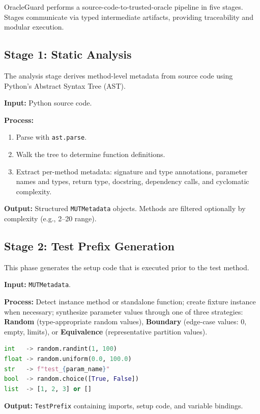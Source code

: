 \documentclass[conference]{IEEEtran}
\begin{document}
OracleGuard performs a source-code-to-trusted-oracle pipeline in five stages. Stages communicate via typed intermediate artifacts, providing traceability and modular execution.

\subsection{Stage 1: Static Analysis}

The analysis stage derives method-level metadata from source code using Python's Abstract Syntax Tree (AST).

\textbf{Input:} Python source code.

\textbf{Process:}
\begin{enumerate}
\item Parse with \texttt{ast.parse}.
\item Walk the tree to determine function definitions.
\item Extract per-method metadata: signature and type annotations, parameter names and types, return type, docstring, dependency calls, and cyclomatic complexity.
\end{enumerate}

\textbf{Output:} Structured \texttt{MUTMetadata} objects. Methods are filtered optionally by complexity (e.g., 2--20 range).

\subsection{Stage 2: Test Prefix Generation}

This phase generates the setup code that is executed prior to the test method.

\textbf{Input:} \texttt{MUTMetadata}.

\textbf{Process:} Detect instance method or standalone function; create fixture instance when necessary; synthesize parameter values through one of three strategies: \textbf{Random} (type-appropriate random values), \textbf{Boundary} (edge-case values: 0, empty, limits), or \textbf{Equivalence} (representative partition values).

\begin{lstlisting}[language=Python]
int   -> random.randint(1, 100)
float -> random.uniform(0.0, 100.0)
str   -> f"test_{param_name}"
bool  -> random.choice([True, False])
list  -> [1, 2, 3] or []
\end{lstlisting}

\textbf{Output:} \texttt{TestPrefix} containing imports, setup code, and variable bindings.
\end{document}
